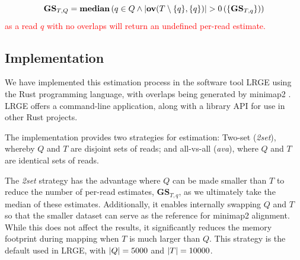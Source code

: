 \documentclass[unnumsec,webpdf,modern,large]{oup-authoring-template}
\theoremstyle{thmstyleone}%
\theoremstyle{thmstyletwo}%
\theoremstyle{thmstylethree}%
\newcommand{\overl}[2]{\mathbf{ov}(#1, #2)}
\newcommand{\overbar}[1]{\mkern 1.5mu\overline{\mkern-1.5mu#1\mkern-1.5mu}\mkern 1.5mu}
\DeclarePairedDelimiter\size{\lvert}{\rvert}
\newcommand{\avglen}[1]{\mathbf{\overbar{\text{$#1$}}}}
\newcommand{\gs}{\textbf{GS}}
\newcommand{\ot}{\textbf{OT}}
\newcommand{\lrge}{LRGE}
\newcommand{\ava}{\textit{ava}}
\newcommand{\twoset}{\textit{2set}}
\newcommand{\changed}[1]{\textcolor{red}{#1}}
\begin{document}
\changed{
\begin{equation}
    \gs_{T,Q} = \textbf{\text{median}}\left({q \in Q \wedge \size{\overl{T \setminus \{q\}}{\{q\}}} >0}\left( \{ \gs_{T, q}  \}\right)\right)
\end{equation}
}
\changed{
as a read $q$ with no overlaps will return an undefined per-read estimate.
}




\subsection{Implementation}

We have implemented this estimation process in the software tool \lrge{} using the Rust programming language, with overlaps being generated by minimap2 \citep{li_minimap2_2018}. \lrge{} offers a command-line application, along with a library API for use in other Rust projects.

The implementation provides two strategies for estimation: Two-set (\twoset{}), whereby $Q$ and $T$ are disjoint sets of reads; and all-vs-all (\ava{}), where $Q$ and $T$ are identical sets of reads.

The \twoset{} strategy has the advantage where $Q$ can be made smaller than $T$ to reduce the number of per-read estimates, $\gs_{T,q}$, as we ultimately take the median of these estimates. Additionally, it enables internally swapping $Q$ and $T$ so that the smaller dataset can serve as the reference for minimap2 alignment. While this does not affect the results, it significantly reduces the memory footprint during mapping when $T$ is much larger than $Q$. This strategy is the default used in \lrge{}, with $\size{Q} = 5000$ and $\size{T} = 10000$.
\end{document}
